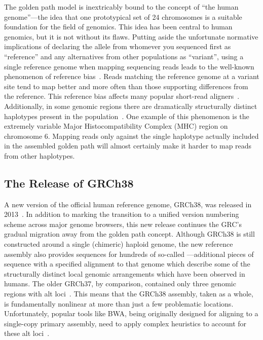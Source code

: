 The golden path model is inextricably bound to the concept of ``the human genome''---the idea that one prototypical set of 24 chromosomes is a suitable foundation for the field of genomics. This idea has been central to human genomics, but it is not without its flaws. Putting aside the unfortunate normative implications of declaring the allele from whomever you sequenced first as ``reference'' and any alternatives from other populations as ``variant'', using a single reference genome when mapping sequencing reads leads to the well-known phenomenon of reference bias~\cite{degner2009effect,brandt2015mapping}. Reads matching the reference genome at a variant site tend to map better and more often than those supporting differences from the reference. This reference bias affects many popular short-read aligners~\cite{lunter2011stampy}. Additionally, in some genomic regions there are dramatically structurally distinct haplotypes present in the population~\cite{church2011modernizing}. One example of this phenomenon is the extremely variable Major Histocompatibility Complex (MHC) region on chromosome 6. Mapping reads only against the single haplotype actually included in the assembled golden path will almost certainly make it harder to map reads from other haplotypes.


\subsection{The Release of GRCh38}

A new version of the official human reference genome, GRCh38, was released in 2013~\cite{grc2013announcing}. In addition to marking the transition to a unified version numbering scheme across major genome browsers, this new release continues the GRC's gradual migration away from the golden path concept. Although GRCh38 is still constructed around a single (chimeric) haploid genome, the new reference assembly also provides sequences for hundreds of so-called ---additional pieces of sequence with a specified alignment to that genome which describe some of the structurally distinct local genomic arrangements which have been observed in humans. The older GRCh37, by comparison, contained only three genomic regions with alt loci~\cite{church2011modernizing}. This means that the GRCh38 assembly, taken as a whole, is fundamentally nonlinear at more than just a few problematic locations. Unfortunately, popular tools like BWA, being originally designed for aligning to a single-copy primary assembly, need to apply complex heuristics to account for these alt loci~\cite{li2014bwa,li2014new}.

